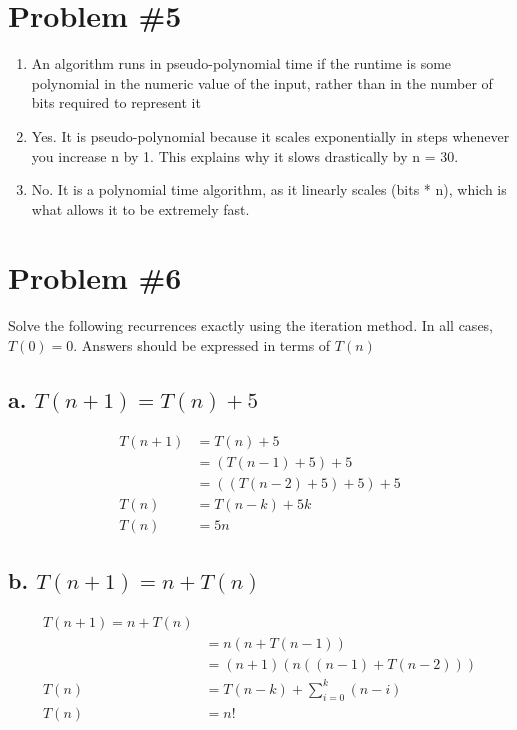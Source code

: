 \documentclass{article}
\begin{document}
\section*{Problem \#5}
\begin{enumerate}[label=(\alph*)]
    \item An algorithm runs in pseudo-polynomial time if the runtime is some polynomial in the numeric value of the input, rather than in the number of bits required to represent it
    \item Yes. It is pseudo-polynomial because it scales exponentially in steps whenever you increase n by 1. This explains why it slows drastically by n = 30.
    \item No. It is a polynomial time algorithm, as it linearly scales (bits * n), which is what allows it to be extremely fast.
\end{enumerate}

\section*{Problem \#6}
Solve the following recurrences exactly using the iteration method. In all cases, \(T(0) = 0\).
Answers should be expressed in terms of \(T(n)\)

\subsection*{a. \(T(n + 1) = T(n) + 5\)}
\begin{subequations}
\begin{align}
T(n + 1) &= T(n) + 5 \\
&= (T(n - 1) + 5) + 5 \\
&= ((T(n - 2) + 5) + 5) + 5 \\
T(n) &= T(n - k) + 5k \\
T(n) &= 5n
\end{align}
\end{subequations}

\subsection*{b. \(T(n + 1) = n + T(n)\)}
\begin{subequations}
  \begin{align}
    T(n + 1) = n + T(n) \\
    &= n(n + T(n - 1)) \\
    &= (n + 1)(n((n - 1) + T(n - 2))) \\
    T(n) &= T(n - k) + \sum_{i=0}^{k}(n - i)\\
    T(n) &= n!
  \end{align}
\end{subequations}
\end{document}
